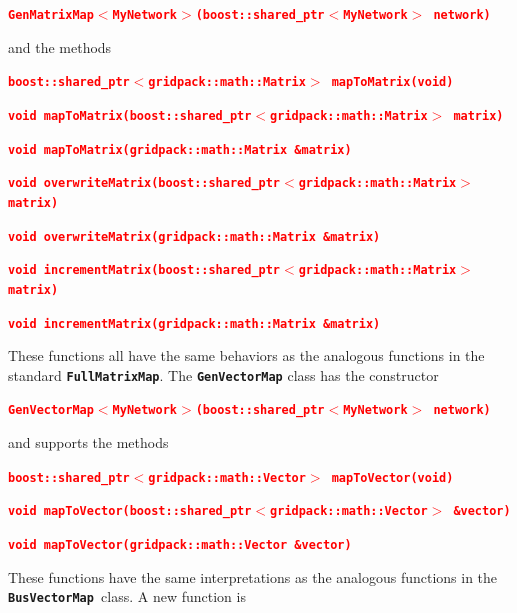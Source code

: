 \documentclass[12pt]{report} %
\begin{document}
\textcolor{red}{\texttt{\textbf{GenMatrixMap$\boldsymbol{\mathrm{<}}$MyNetwork$\boldsymbol{\mathrm{>}}$(boost::shared\_ptr$\boldsymbol{\mathrm{<}}$MyNetwork$\boldsymbol{\mathrm{>}}$ network)}}}

and the methods

\textcolor{red}{\texttt{\textbf{boost::shared\_ptr$\boldsymbol{\mathrm{<}}$gridpack::math::Matrix$\boldsymbol{\mathrm{>}}$ mapToMatrix(void)}}}

\textcolor{red}{\texttt{\textbf{void mapToMatrix(boost::shared\_ptr$\boldsymbol{\mathrm{<}}$gridpack::math::Matrix$\boldsymbol{\mathrm{>}}$ matrix)}}}

\textcolor{red}{\texttt{\textbf{void mapToMatrix(gridpack::math::Matrix \&matrix)}}}

\textcolor{red}{\texttt{\textbf{void overwriteMatrix(boost::shared\_ptr$\boldsymbol{\mathrm{<}}$gridpack::math::Matrix$\boldsymbol{\mathrm{>}}$ matrix)}}}

\textcolor{red}{\texttt{\textbf{void overwriteMatrix(gridpack::math::Matrix \&matrix)}}}

\textcolor{red}{\texttt{\textbf{void incrementMatrix(boost::shared\_ptr$\boldsymbol{\mathrm{<}}$gridpack::math::Matrix$\boldsymbol{\mathrm{>}}$ matrix)}}}

\textcolor{red}{\texttt{\textbf{void incrementMatrix(gridpack::math::Matrix \&matrix)}}}

These functions all have the same behaviors as the analogous functions in the standard \texttt{\textbf{FullMatrixMap}}. The \texttt{\textbf{GenVectorMap}} class has the constructor

\textcolor{red}{\texttt{\textbf{GenVectorMap$\boldsymbol{\mathrm{<}}$MyNetwork$\boldsymbol{\mathrm{>}}$(boost::shared\_ptr$\boldsymbol{\mathrm{<}}$MyNetwork$\boldsymbol{\mathrm{>}}$ network)}}}

and supports the methods

\textcolor{red}{\texttt{\textbf{boost::shared\_ptr$\boldsymbol{\mathrm{<}}$gridpack::math::Vector$\boldsymbol{\mathrm{>}}$ mapToVector(void)}}}

\textcolor{red}{\texttt{\textbf{void mapToVector(boost::shared\_ptr$\boldsymbol{\mathrm{<}}$gridpack::math::Vector$\boldsymbol{\mathrm{>}}$ \&vector)}}}

\textcolor{red}{\texttt{\textbf{void mapToVector(gridpack::math::Vector \&vector)}}}

These functions have the same interpretations as the analogous functions in the \texttt{\textbf{BusVectorMap }}class. A new function is
\end{document}
